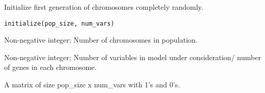 %
\begin{Description}\relax
Initialize first generation of chromosomes completely randomly.
\end{Description}
%
\begin{Usage}
\begin{verbatim}
initialize(pop_size, num_vars)
\end{verbatim}
\end{Usage}
%
\begin{Arguments}
\begin{ldescription}
\item[\code{pop\_size}] Non-negative integer; Number of chromosomes in population.

\item[\code{num\_vars}] Non-negative integer; Number of variables in model under consideration/
number of genes in each chromosome.
\end{ldescription}
\end{Arguments}
%
\begin{Value}
A matrix of size pop\_size x num\_vars with 1's and 0's.
\end{Value}
